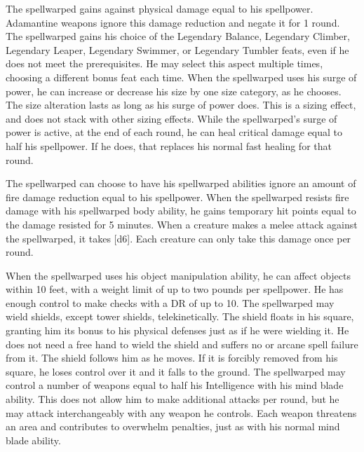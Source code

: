         The spellwarped gains  against physical damage equal to his spellpower.
        Adamantine weapons ignore this damage reduction and negate it for 1 round.
        The spellwarped gains his choice of the Legendary Balance, Legendary Climber, Legendary Leaper, Legendary Swimmer, or Legendary Tumbler feats, even if he does not meet the prerequisites.
        He may select this aspect multiple times, choosing a different bonus feat each time.
        When the spellwarped uses his surge of power, he can increase or decrease his size by one size category, as he chooses.
        The size alteration lasts as long as his surge of power does.
        This is a sizing effect, and does not stack with other sizing effects.
        While the spellwarped's surge of power is active, at the end of each round, he can heal critical damage equal to half his spellpower.
        If he does, that replaces his normal fast healing for that round.

        The spellwarped can choose to have his spellwarped abilities ignore an amount of fire damage reduction equal to his spellpower.
        When the spellwarped resists fire damage with his spellwarped body ability, he gains temporary hit points equal to the damage resisted for 5 minutes.
        When a creature makes a melee attack against the spellwarped, it takes [d6].
        Each creature can only take this damage once per round.

        When the spellwarped uses his object manipulation ability, he can affect objects within 10 feet, with a weight limit of up to two pounds per spellpower.
        He has enough control to make checks with a DR of up to 10.
        The spellwarped may wield shields, except tower shields, telekinetically.
        The shield floats in his square, granting him its bonus to his physical defenses just as if he were wielding it.
        He does not need a free hand to wield the shield and suffers no  or arcane spell failure from it.
        The shield follows him as he moves.
        If it is forcibly removed from his square, he loses control over it and it falls to the ground.
        The spellwarped may control a number of weapons equal to half his Intelligence with his mind blade ability.
        This does not allow him to make additional attacks per round, but he may attack interchangeably with any weapon he controls.
        Each weapon threatens an area and contributes to overwhelm penalties, just as with his normal mind blade ability.

